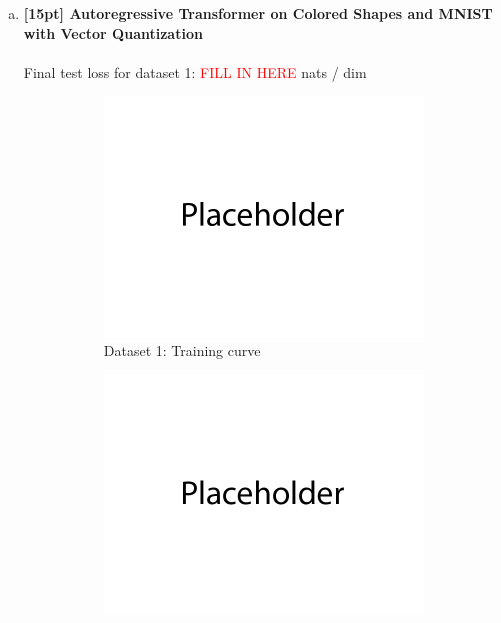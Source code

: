 \documentclass{article}
\begin{document}
\begin{enumerate}[(a)]
\item {\bf [15pt] Autoregressive Transformer on Colored Shapes and MNIST with Vector Quantization} \\\\
Final test loss for dataset 1: \textcolor{red}{FILL IN HERE}  nats / dim
\begin{figure}[H]
    \centering
    \begin{subfigure}{0.45\textwidth}
        \centering
        \includegraphics[width=\textwidth]{figures/placeholder.png}
        \caption{Dataset 1: Training curve}
    \end{subfigure}
    \hspace{0.2in}
    \begin{subfigure}{0.45\textwidth}
        \centering
        \includegraphics[width=\textwidth]{figures/placeholder.png}

\end{subfigure}
\end{figure}
\end{enumerate}
\end{document}
